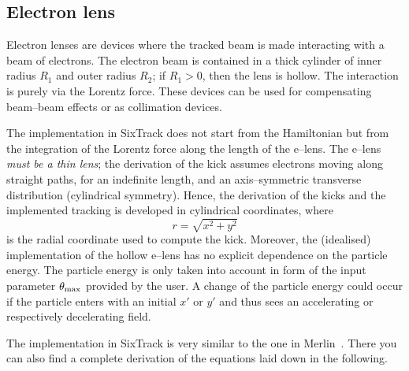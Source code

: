 \documentclass[english]{article}
\begin{document}
\subsection{Electron lens}
\label{elense}
Electron lenses are devices where the tracked beam is made interacting with a beam of electrons.
The electron beam is contained in a thick cylinder of inner radius $R_1$ and outer radius $R_2$;
if $R_1>0$, then the lens is hollow. The interaction is purely via the Lorentz force.
These devices can be used for compensating beam--beam effects or as collimation devices.

The implementation in SixTrack does not start from the Hamiltonian but from the
integration of the Lorentz force along the length of the e--lens. The e--lens \emph{must be a thin lens};
the derivation of the kick assumes electrons moving along straight paths,
for an indefinite length, and an axis--symmetric transverse distribution (cylindrical symmetry). Hence,
the derivation of the kicks and the implemented tracking is developed in cylindrical coordinates, where
\begin{equation}
  r=\sqrt{x^2+y^2}
\end{equation}
is the radial coordinate used to compute the kick. Moreover,
the (idealised) implementation of the hollow e--lens has no explicit dependence on the particle energy.
The particle energy is only taken into account in form of the input parameter $\theta_{\rm max}$ provided
by the user. A change of the particle energy could occur if the particle enters with an initial $x'$ or
$y'$ and thus sees an accelerating or respectively decelerating field.

The implementation in SixTrack is very similar to the one in Merlin~\cite{HReLens}.
There you can also find a complete derivation of the equations laid down in the
following.
\end{document}
